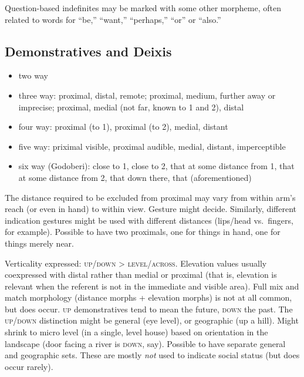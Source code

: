 \documentclass[11pt]{article}
\newcommand{\I}[1]{\textsc{#1}}   %
\newenvironment{grammarlist}%
 {\begin{itemize}\addtolength{\itemsep}{-0.5\baselineskip}\ignorespaces}%
 {\end{itemize}\ignorespacesafterend}
\begin{document}
Question-based indefinites may be marked with some other morpheme,
often related to words for ``be,'' ``want,'' ``perhaps,'' ``or'' or
``also.''


\subsection{Demonstratives and Deixis}

\begin{grammarlist}
  \item two way
  \item three way: proximal, distal, remote; proximal, medium, further
    away or imprecise; proximal, medial (not far, known to 1 and 2),
    distal
  \item four way: proximal (to 1), proximal (to 2), medial, distant
  \item five way: priximal visible, proximal audible, medial, distant,
    imperceptible
  \item six way (Godoberi): close to 1, close to 2, that at some
    distance from 1, that at some distance from 2, that down there,
    that (aforementioned)
\end{grammarlist}

The distance required to be excluded from proximal may vary from
within arm's reach (or even in hand) to within view.  Gesture might
decide.  Similarly, different indication gestures might be used with
different distances (lips/head vs.\ fingers, for example).  Possible
to have two proximals, one for things in hand, one for things merely
near.

Verticality expressed: \I{up/down} > \I{level/across}.  Elevation
values usually coexpressed with distal rather than medial or proximal
(that is, elevation is relevant when the referent is not in the
immediate and visible area).  Full mix and match morphology (distance
morphs + elevation morphs) is not at all common, but does occur.
\I{up} demonstratives tend to mean the future, \I{down} the past.  The
\I{up/down} distinction might be general (eye level), or geographic
(up a hill).  Might shrink to micro level (in a single, level house)
based on orientation in the landscape (door facing a river is
\I{down}, say).  Possible to have separate general and geographic
sets.  These are mostly \textit{not} used to indicate social status
(but does occur rarely).
\end{document}

